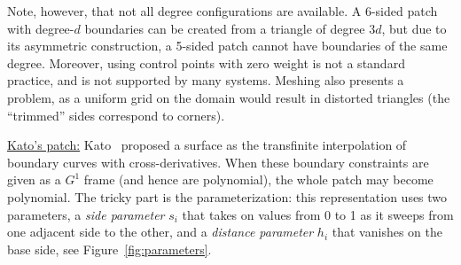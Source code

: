 \documentclass{article}
\begin{document}
Note, however, that not all degree configurations are available. A 6-sided patch with degree-$d$
boundaries can be created from a triangle of degree $3d$, but due to its asymmetric construction,
a 5-sided patch cannot have boundaries of the same degree. Moreover, using control points with zero
weight is not a standard practice, and is not supported by many systems. Meshing
also presents a problem, as a uniform grid on the domain would result in distorted triangles
(the ``trimmed'' sides correspond to corners).


\vspace{10pt}
\noindent\underline{Kato's patch:}\vspace{0.2em}\newline
Kato~\cite{kato} proposed a surface as the transfinite interpolation of boundary curves with
cross-derivatives. When these boundary constraints are given as a $G^1$ frame (and hence
are polynomial), the whole patch may become polynomial. The tricky part is the parameterization:
this representation uses two parameters, a \emph{side parameter} $s_i$
that takes on values from 0 to 1 as it sweeps from one adjacent side to the other,
and a \emph{distance parameter} $h_i$ that vanishes on the base side, see
Figure~\ref{fig:parameters}.
\end{document}
